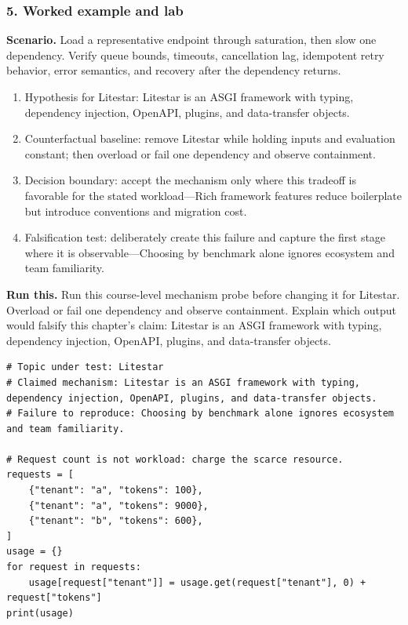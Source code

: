 \subsubsection*{5. Worked example and lab}
\textbf{Scenario.} Load a representative endpoint through saturation, then slow one dependency. Verify queue bounds, timeouts, cancellation lag, idempotent retry behavior, error semantics, and recovery after the dependency returns.
\begin{enumerate}
\item Hypothesis for Litestar: Litestar is an ASGI framework with typing, dependency injection, OpenAPI, plugins, and data-transfer objects.
\item Counterfactual baseline: remove Litestar while holding inputs and evaluation constant; then overload or fail one dependency and observe containment.
\item Decision boundary: accept the mechanism only where this tradeoff is favorable for the stated workload—Rich framework features reduce boilerplate but introduce conventions and migration cost.
\item Falsification test: deliberately create this failure and capture the first stage where it is observable—Choosing by benchmark alone ignores ecosystem and team familiarity.
\end{enumerate}
\textbf{Run this.} Run this course-level mechanism probe before changing it for Litestar. Overload or fail one dependency and observe containment. Explain which output would falsify this chapter's claim: Litestar is an ASGI framework with typing, dependency injection, OpenAPI, plugins, and data-transfer objects.
\begin{Verbatim}[fontsize=\scriptsize]
# Topic under test: Litestar
# Claimed mechanism: Litestar is an ASGI framework with typing, dependency injection, OpenAPI, plugins, and data-transfer objects.
# Failure to reproduce: Choosing by benchmark alone ignores ecosystem and team familiarity.

# Request count is not workload: charge the scarce resource.
requests = [
    {"tenant": "a", "tokens": 100},
    {"tenant": "a", "tokens": 9000},
    {"tenant": "b", "tokens": 600},
]
usage = {}
for request in requests:
    usage[request["tenant"]] = usage.get(request["tenant"], 0) + request["tokens"]
print(usage)
\end{Verbatim}
